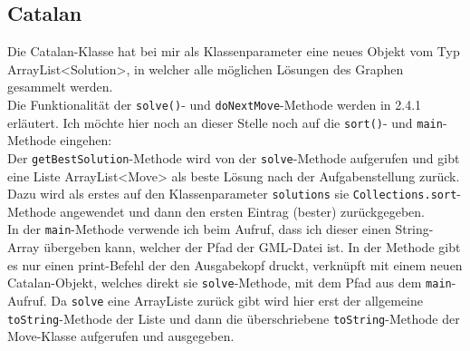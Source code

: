 \documentclass[12pt,a4paper]{article}
\begin{document}
\subsection{Catalan}
Die Catalan-Klasse hat bei mir als Klassenparameter eine neues Objekt vom Typ ArrayList<Solution>, in welcher alle möglichen Lösungen des Graphen gesammelt werden.\\
Die Funktionalität der \texttt{solve()}- und \texttt{doNextMove}-Methode werden in 2.4.1 erläutert. Ich möchte hier noch an dieser Stelle noch auf die \texttt{sort()}- und \texttt{main}-Methode eingehen:\\
Der \texttt{getBestSolution}-Methode wird von der \texttt{solve}-Methode aufgerufen und gibt eine Liste ArrayList<Move> als beste Lösung nach der Aufgabenstellung zurück. Dazu wird als erstes auf den Klassenparameter \texttt{solutions} sie \texttt{Collections.sort}-Methode angewendet und dann den ersten Eintrag (bester) zurückgegeben.\\
In der \texttt{main}-Methode verwende ich beim Aufruf, dass ich dieser einen String-Array übergeben kann, welcher der Pfad der GML-Datei ist. In der Methode gibt es nur einen print-Befehl der den Ausgabekopf druckt, verknüpft mit einem neuen Catalan-Objekt, welches direkt sie \texttt{solve}-Methode, mit dem Pfad aus dem \texttt{main}-Aufruf. Da \texttt{solve} eine ArrayListe zurück gibt wird hier erst der allgemeine \texttt{toString}-Methode der Liste und dann die überschriebene \texttt{toString}-Methode der Move-Klasse aufgerufen und ausgegeben.
\end{document}
